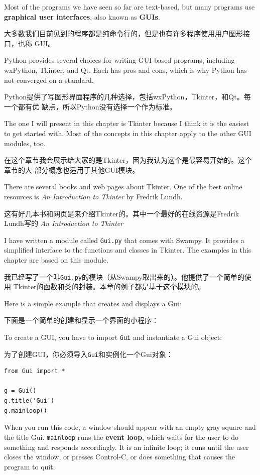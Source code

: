 \documentclass[10pt]{book}
\begin{document}
\begin{CJK}{UTF8}{gbsn}
Most of the programs we have seen so far are text-based, but
many programs use {\bf graphical user interfaces}, also
known as {\bf GUIs}.

大多数我们目前见到的程序都是纯命令行的，但是也有许多程序使用用户图形接口，也称
GUI。

Python provides several choices for writing GUI-based programs,
including wxPython, Tkinter, and Qt.  Each has pros and cons, which
is why Python has not converged on a standard.

Python提供了写图形界面程序的几种选择，包括wxPython，Tkinter，和Qt。每一个都有优
缺点，所以Python没有选择一个作为标准。

The one I will present in this chapter is Tkinter because I think
it is the easiest to get started with.  Most of the concepts
in this chapter apply to the other GUI modules, too.

在这个章节我会展示给大家的是Tkinter，因为我认为这个是最容易开始的。这个章节的大
部分概念也适用于其他GUI模块。

There are several books and web pages about Tkinter.  One of
the best online resources is {\em An Introduction to Tkinter}
by Fredrik Lundh.

这有好几本书和网页是来介绍Tkinter的。其中一个最好的在线资源是Fredrik Lundh写的
{\em An Introduction to Tkinter}

I have written a module called {\tt Gui.py} that comes with
Swampy.  It provides a simplified interface to the functions
and classes in Tkinter.  The examples in this chapter are
based on this module.

我已经写了一个叫{\tt Gui.py}的模块（从Swampy取出来的）。他提供了一个简单的使用
Tkinter的函数和类的封装。本章的例子都是基于这个模块的。

Here is a simple example that creates and displays a Gui:

下面是一个简单的创建和显示一个界面的小程序：

To create a GUI, you have to import {\tt Gui} and instantiate
a Gui object:

为了创建GUI，你必须导入{\tt Gui}和实例化一个Gui对象：

\begin{verbatim}
from Gui import *

g = Gui()
g.title('Gui')
g.mainloop()
\end{verbatim}
%
When you run this code, a window should appear with an empty gray
square and the title {\sf Gui}.  {\tt mainloop} runs the {\bf event
  loop}, which waits for the user to do something and responds
accordingly.  It is an infinite loop; it runs until the user closes
the window, or presses Control-C, or does something that causes the
program to quit.


\end{CJK}
\end{document}
